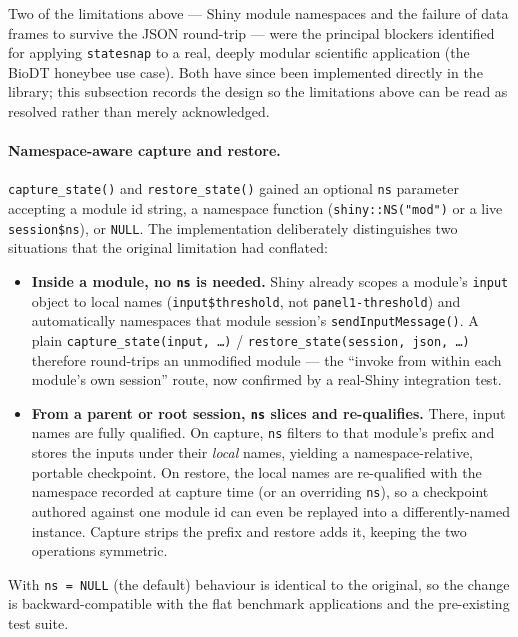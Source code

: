 \documentclass[11pt,a4paper]{article}
\begin{document}
Two of the limitations above --- Shiny module namespaces and the failure of data
frames to survive the JSON round-trip --- were the principal blockers identified
for applying \texttt{statesnap} to a real, deeply modular scientific application
(the BioDT honeybee use case). Both have since been implemented directly in the
library; this subsection records the design so the limitations above can be read
as resolved rather than merely acknowledged.

\paragraph{Namespace-aware capture and restore.} \texttt{capture\_state()} and
\texttt{restore\_state()} gained an optional \texttt{ns} parameter accepting a
module id string, a namespace function (\texttt{shiny::NS("mod")} or a live
\texttt{session\$ns}), or \texttt{NULL}. The implementation deliberately
distinguishes two situations that the original limitation had conflated:
\begin{itemize}[nosep]
  \item \textbf{Inside a module, no \texttt{ns} is needed.} Shiny already scopes
    a module's \texttt{input} object to local names (\texttt{input\$threshold},
    not \texttt{panel1-threshold}) and automatically namespaces that module
    session's \texttt{sendInputMessage()}. A plain
    \texttt{capture\_state(input, \dots)} / \texttt{restore\_state(session, json,
    \dots)} therefore round-trips an unmodified module --- the ``invoke from
    within each module's own session'' route, now confirmed by a real-Shiny
    integration test.
  \item \textbf{From a parent or root session, \texttt{ns} slices and
    re-qualifies.} There, input names are fully qualified. On capture,
    \texttt{ns} filters to that module's prefix and stores the inputs under their
    \emph{local} names, yielding a namespace-relative, portable checkpoint. On
    restore, the local names are re-qualified with the namespace recorded at
    capture time (or an overriding \texttt{ns}), so a checkpoint authored against
    one module id can even be replayed into a differently-named instance. Capture
    strips the prefix and restore adds it, keeping the two operations symmetric.
\end{itemize}
With \texttt{ns = NULL} (the default) behaviour is identical to the original, so
the change is backward-compatible with the flat benchmark applications and the
pre-existing test suite.
\end{document}
